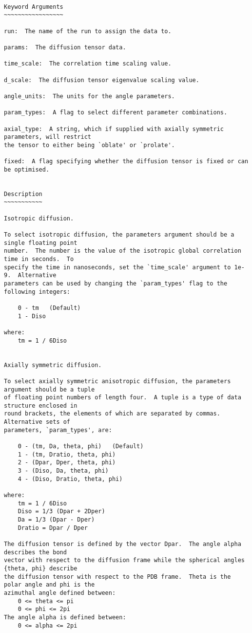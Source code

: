 {\scriptsize
\begin{verbatim}

Keyword Arguments
~~~~~~~~~~~~~~~~~

run:  The name of the run to assign the data to.

params:  The diffusion tensor data.

time_scale:  The correlation time scaling value.

d_scale:  The diffusion tensor eigenvalue scaling value.

angle_units:  The units for the angle parameters.

param_types:  A flag to select different parameter combinations.

axial_type:  A string, which if supplied with axially symmetric parameters, will restrict
the tensor to either being `oblate' or `prolate'.

fixed:  A flag specifying whether the diffusion tensor is fixed or can be optimised.


Description
~~~~~~~~~~~

Isotropic diffusion.

To select isotropic diffusion, the parameters argument should be a single floating point
number.  The number is the value of the isotropic global correlation time in seconds.  To
specify the time in nanoseconds, set the `time_scale' argument to 1e-9.  Alternative
parameters can be used by changing the `param_types' flag to the following integers:

    0 - tm   (Default)
    1 - Diso

where:
    tm = 1 / 6Diso


Axially symmetric diffusion.

To select axially symmetric anisotropic diffusion, the parameters argument should be a tuple
of floating point numbers of length four.  A tuple is a type of data structure enclosed in
round brackets, the elements of which are separated by commas.  Alternative sets of
parameters, `param_types', are:

    0 - (tm, Da, theta, phi)   (Default)
    1 - (tm, Dratio, theta, phi)
    2 - (Dpar, Dper, theta, phi)
    3 - (Diso, Da, theta, phi)
    4 - (Diso, Dratio, theta, phi)

where:
    tm = 1 / 6Diso
    Diso = 1/3 (Dpar + 2Dper)
    Da = 1/3 (Dpar - Dper)
    Dratio = Dpar / Dper

The diffusion tensor is defined by the vector Dpar.  The angle alpha describes the bond
vector with respect to the diffusion frame while the spherical angles {theta, phi} describe
the diffusion tensor with respect to the PDB frame.  Theta is the polar angle and phi is the
azimuthal angle defined between:
    0 <= theta <= pi
    0 <= phi <= 2pi
The angle alpha is defined between:
    0 <= alpha <= 2pi


\end{verbatim}}
